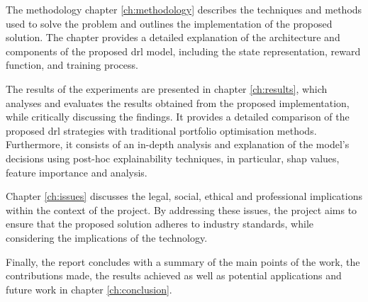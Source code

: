 The methodology chapter \ref{ch:methodology} describes the techniques and methods used to solve the problem and outlines the implementation of the proposed solution. The chapter provides a detailed explanation of the architecture and components of the proposed \acrshort{drl} model, including the state representation, reward function, and training process.

The results of the experiments are presented in chapter \ref{ch:results}, which analyses and evaluates the results obtained from the proposed implementation, while critically discussing the findings. It provides a detailed comparison of the proposed \acrshort{drl} strategies with traditional portfolio optimisation methods. Furthermore, it consists of an in-depth analysis and explanation of the model's decisions using post-hoc explainability techniques, in particular, \acrshort{shap} values, feature importance and  analysis. 

Chapter \ref{ch:issues} discusses the legal, social, ethical and professional implications within the context of the project. By addressing these issues, the project aims to ensure that the proposed solution adheres to industry standards, while considering the implications of the technology.

Finally, the report concludes with a summary of the main points of the work, the contributions made, the results achieved as well as potential applications and future work in chapter \ref{ch:conclusion}.
